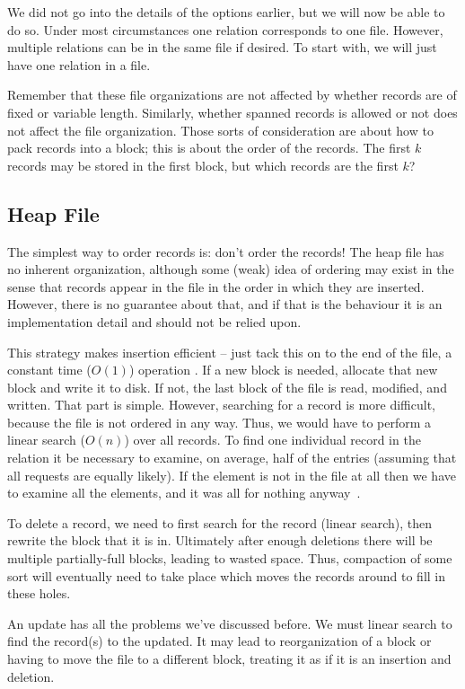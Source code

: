 \documentclass[a4paper]{report}
\begin{document}
We did not go into the details of the options earlier, but we will now be able to do so. Under most circumstances one relation corresponds to one file. However, multiple relations can be in the same file if desired. To start with, we will just have one relation in a file. 

Remember that these file organizations are not affected by whether records are of fixed or variable length. Similarly, whether spanned records is allowed or not does not affect the file organization. Those sorts of consideration are about how to pack records into a block; this is about the order of the records. The first $k$ records may be stored in the first block, but which records are the first $k$?

\subsection*{Heap File} 

The simplest way to order records is: don't order the records! The heap file has no inherent organization, although some (weak) idea of ordering may exist in the sense that records appear in the file in the order in which they are inserted. However, there is no guarantee about that, and if that is the behaviour it is an implementation detail and should not be relied upon. 

This strategy makes insertion efficient -- just tack this on to the end of the file, a constant time ($O(1)$) operation . If a new block is needed, allocate that new block and write it to disk. If not, the last block of the file is read, modified, and written. That part is simple. However, searching for a record is more difficult, because the file is not ordered in any way. Thus, we would have to perform a linear search ($O(n)$) over all records. To find one individual record in the relation it be necessary to examine, on average, half of the entries (assuming that all requests are equally likely). If the element is not in the file at all then we have to examine all the elements, and it was all for nothing anyway~\cite{fds}. 

To delete a record, we need to first search for the record (linear search), then rewrite the block that it is in. Ultimately after enough deletions there will be multiple partially-full blocks, leading to wasted space. Thus, compaction of some sort will eventually need to take place which moves the records around to fill in these holes.

An update has all the problems we've discussed before. We must linear search to find the record(s) to the updated.  It may lead to reorganization of a block or having to move the file to a different block, treating it as if it is an insertion and deletion.  
\end{document}
